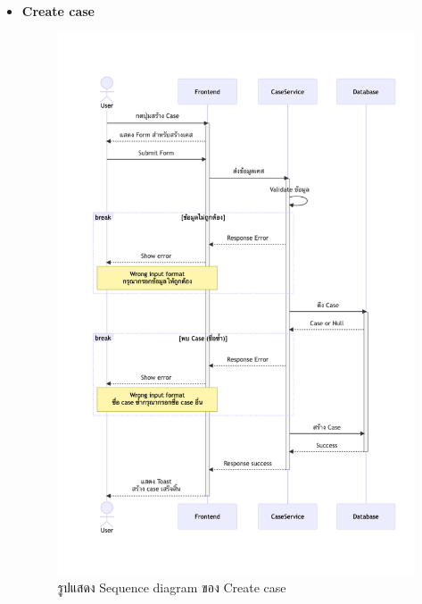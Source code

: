 \documentclass[12pt,oneside,openright,a4paper]{cpe-thai-project}
\begin{document}
\begin{itemize}

    \item \textbf{Create case}\\
    \begin{figure}[!ht]\centering
        \includegraphics[width=13cm, trim={0 4cm 0 0},clip]{./assets/sequence-diagram/create-case.png}
        \caption{รูปแสดง Sequence diagram ของ Create case}\label{fig:sqCreateCase}
    \end{figure}


\end{itemize}
\end{document}
